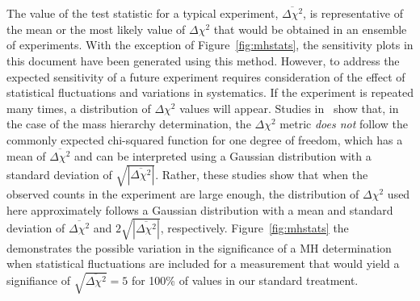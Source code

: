 

The value of the test statistic for a typical experiment,  
$\overline{\Delta\chi^2}$, is
representative of the mean or the most likely value of $\Delta\chi^2$ that 
would be obtained in an ensemble of experiments.
With the exception of Figure~\ref{fig:mhstats}, the sensitivity plots
in this document have been generated using this method.
However, to address the expected sensitivity of a future experiment
requires consideration of the effect of
statistical fluctuations and variations in systematics.  If the
experiment is repeated many times, a distribution of $\Delta\chi^2$
values will appear.  Studies in~\cite{Qian:2012zn,Blennow:2013oma}
show that, in the case of the mass hierarchy
determination, the $\Delta \chi^2$ metric
{\em does not} follow the commonly expected chi-squared
function for one degree of freedom, which has a mean of
$\overline{\Delta\chi^2}$ and can be interpreted using a Gaussian
distribution with a standard deviation of
$\sqrt{|\overline{\Delta\chi^2}|}$. Rather, these studies show that
when the observed counts in the experiment are large enough,
the distribution of $\Delta\chi^2$ used here approximately follows
a Gaussian distribution with a
mean and standard deviation of $\overline{\Delta\chi^2}$ and
$2\sqrt{|\overline{\Delta\chi^2}|}$, respectively. Figure~\ref{fig:mhstats} the
demonstrates the possible variation in the significance of a MH determination when statistical
fluctuations are included for a measurement that would yield a signifiance of $\sqrt{\overline{\Delta\chi^{2}}} = 5$ for 100\% of \deltacp values in our standard treatment.

